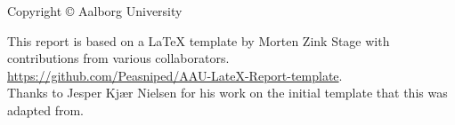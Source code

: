 \thispagestyle{empty}
{\small
\strut\vfill %
\noindent Copyright \copyright{}\the\year{} Aalborg University\\
\par
\noindent This report is based on a LaTeX template by Morten Zink Stage with contributions from various collaborators.\\
\url{https://github.com/Peasniped/AAU-LateX-Report-template}.\\
Thanks to Jesper Kjær Nielsen for his work on the initial template that this was adapted from.\par
\vspace{0.2cm}
\noindent \myColophon
}

\clearpage